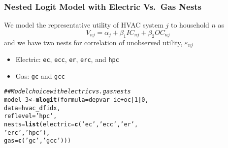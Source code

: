 \documentclass{beamer}\usepackage[]{graphicx}\usepackage[]{xcolor}
\makeatletter
\newcommand{\hlnum}[1]{\textcolor[rgb]{0.686,0.059,0.569}{#1}}%
\newcommand{\hlstr}[1]{\textcolor[rgb]{0.192,0.494,0.8}{#1}}%
\newcommand{\hlcom}[1]{\textcolor[rgb]{0.678,0.584,0.686}{\textit{#1}}}%
\newcommand{\hlopt}[1]{\textcolor[rgb]{0,0,0}{#1}}%
\newcommand{\hlstd}[1]{\textcolor[rgb]{0.345,0.345,0.345}{#1}}%
\newcommand{\hlkwb}[1]{\textcolor[rgb]{0.69,0.353,0.396}{#1}}%
\newcommand{\hlkwc}[1]{\textcolor[rgb]{0.333,0.667,0.333}{#1}}%
\newcommand{\hlkwd}[1]{\textcolor[rgb]{0.737,0.353,0.396}{\textbf{#1}}}%
\newenvironment{kframe}{%
 \def\at@end@of@kframe{}%
 \ifinner\ifhmode%
  \def\at@end@of@kframe{\end{minipage}}%
  \begin{minipage}{\columnwidth}%
 \fi\fi%
 \def\FrameCommand##1{\hskip\@totalleftmargin \hskip-\fboxsep
 \colorbox{shadecolor}{##1}\hskip-\fboxsep
     \hskip-\linewidth \hskip-\@totalleftmargin \hskip\columnwidth}%
 \MakeFramed {\advance\hsize-\width
   \@totalleftmargin\z@ \linewidth\hsize
   \@setminipage}}%
 {\par\unskip\endMakeFramed%
 \at@end@of@kframe}
\newenvironment{knitrout}{}{} %
\makeatother
\begin{document}
\begin{frame}[fragile]\frametitle{Nested Logit Model with Electric Vs.\ Gas Nests}
    We model the representative utility of HVAC system $j$ to household $n$ as
    $$V_{nj} = \alpha_j + \beta_1 IC_{nj} + \beta_2 OC_{nj}$$
    and we have two nests for correlation of unobserved utility, $\varepsilon_{nj}$
    \begin{itemize}
    	\item Electric: \texttt{ec}, \texttt{ecc}, \texttt{er}, \texttt{erc}, and \texttt{hpc}
    	\item Gas: \texttt{gc} and \texttt{gcc}
    \end{itemize}
\begin{knitrout}\footnotesize
{}\color{fgcolor}\begin{kframe}
\begin{alltt}
\hlcom{## Model choice with electric vs. gas nests}
\hlstd{model_3} \hlkwb{<-} \hlkwd{mlogit}\hlstd{(}\hlkwc{formula} \hlstd{= depvar} \hlopt{~} \hlstd{ic} \hlopt{+} \hlstd{oc} \hlopt{|} \hlnum{1} \hlopt{|} \hlnum{0}\hlstd{,}
                  \hlkwc{data} \hlstd{= hvac_dfidx,}
                  \hlkwc{reflevel} \hlstd{=} \hlstr{'hpc'}\hlstd{,}
                  \hlkwc{nests} \hlstd{=} \hlkwd{list}\hlstd{(}\hlkwc{electric} \hlstd{=} \hlkwd{c}\hlstd{(}\hlstr{'ec'}\hlstd{,} \hlstr{'ecc'}\hlstd{,} \hlstr{'er'}\hlstd{,}
                                            \hlstr{'erc'}\hlstd{,} \hlstr{'hpc'}\hlstd{),}
                               \hlkwc{gas} \hlstd{=} \hlkwd{c}\hlstd{(}\hlstr{'gc'}\hlstd{,} \hlstr{'gcc'}\hlstd{)))}
\end{alltt}
\end{kframe}
\end{knitrout}
\end{frame}
\end{document}
